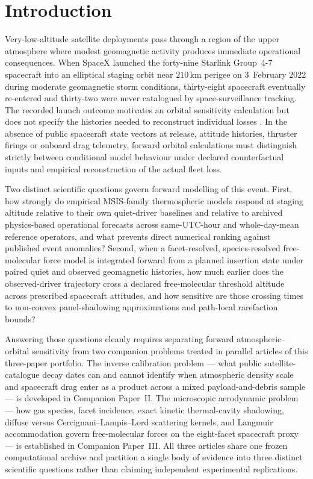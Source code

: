 \documentclass[12pt]{article}
\newcommand{\unit}[1]{\,\mathrm{#1}}
\begin{document}
\section{Introduction}
\label{sec:intro}

Very-low-altitude satellite deployments pass through a region of the upper atmosphere where modest geomagnetic activity produces immediate operational consequences. When SpaceX launched the forty-nine Starlink Group~4-7 spacecraft into an elliptical staging orbit near $210\unit{km}$ perigee on 3~February 2022 during moderate geomagnetic storm conditions, thirty-eight spacecraft eventually re-entered and thirty-two were never catalogued by space-surveillance tracking. The recorded launch outcome motivates an orbital sensitivity calculation but does not specify the histories needed to reconstruct individual losses \citep{guarnieri2025}. In the absence of public spacecraft state vectors at release, attitude histories, thruster firings or onboard drag telemetry, forward orbital calculations must distinguish strictly between conditional model behaviour under declared counterfactual inputs and empirical reconstruction of the actual fleet loss.

Two distinct scientific questions govern forward modelling of this event. First, how strongly do empirical MSIS-family thermospheric models respond at staging altitude relative to their own quiet-driver baselines and relative to archived physics-based operational forecasts across same-UTC-hour and whole-day-mean reference operators, and what prevents direct numerical ranking against published event anomalies? Second, when a facet-resolved, species-resolved free-molecular force model is integrated forward from a planned insertion state under paired quiet and observed geomagnetic histories, how much earlier does the observed-driver trajectory cross a declared free-molecular threshold altitude across prescribed spacecraft attitudes, and how sensitive are those crossing times to non-convex panel-shadowing approximations and path-local rarefaction bounds?

Answering those questions cleanly requires separating forward atmospheric--orbital sensitivity from two companion problems treated in parallel articles of this three-paper portfolio. The inverse calibration problem --- what public satellite-catalogue decay dates can and cannot identify when atmospheric density scale and spacecraft drag enter as a product across a mixed payload-and-debris sample --- is developed in Companion Paper~II. The microscopic aerodynamic problem --- how gas species, facet incidence, exact kinetic thermal-cavity shadowing, diffuse versus Cercignani--Lampis--Lord scattering kernels, and Langmuir accommodation govern free-molecular forces on the eight-facet spacecraft proxy --- is established in Companion Paper~III. All three articles share one frozen computational archive and partition a single body of evidence into three distinct scientific questions rather than claiming independent experimental replications.
\end{document}
